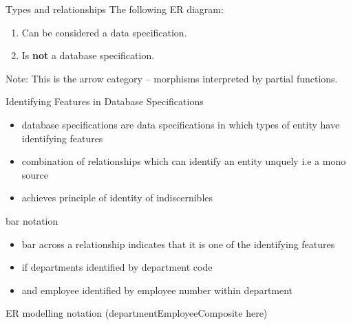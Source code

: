 \documentclass[xcolor=pst,dvips]{beamer}   %
\renewcommand{\erpictureFolder}[0]{../SharedPictures}
\begin{document}
\begin{frame}{Types and relationships}
The following ER diagram:
\begin{center}
\scalebox{0.9}{

}
\end{center}
\begin{center}
\begin{enumerate}
\item Can be considered a data specification.
\item Is \textbf{not} a database specification. 
\end{enumerate}
\end{center}
Note: This is the arrow category -- morphisms interpreted by partial functions. 
\end{frame}

\begin{frame}{Identifying Features in Database Specifications}
\begin{itemize}
\item database specifications are data specifications in which types of entity have 
identifying features
\item combination of relationships which can identify an entity unquely
i.e a mono source
\item achieves principle of identity of indiscernibles
\end {itemize}
\end{frame}

\begin{frame}{bar notation}
\begin{itemize}
\item bar across a relationship indicates that it is one of the identifying features
\item if departments identified by department code
\item and employee identified by employee number within department 
\end{itemize}
\end{frame}

\begin{frame}
\begin{center}{ER modelling notation}
(departmentEmployeeComposite here)
\iffalse
\scalebox{0.50}{

}
\fi
\end{center}
\end{frame}

\iffalse
\begin{frame}{ER modelling notation}
\begin{center}
\scalebox{0.85}{

}
\end{center}
\end{frame}
\fi
\end{document}
